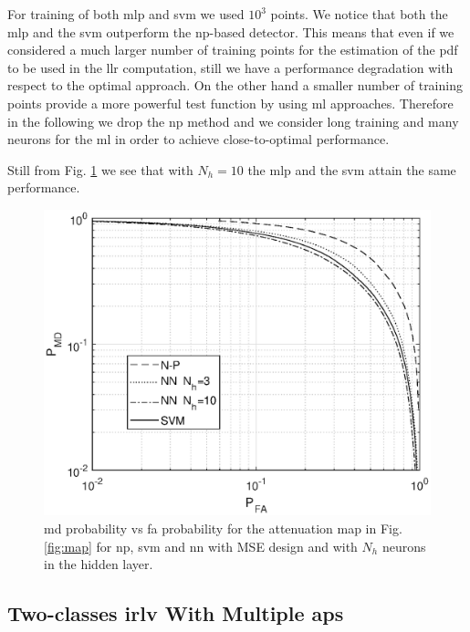 \documentclass[draftcls,onecolumn,12pt]{IEEEtran}
\begin{document}
For training of both \ac{mlp} and \ac{svm} we used $10^3$ points. We notice that both the \ac{mlp} and the \ac{svm} outperform the \ac{np}-based detector. This means that even if we considered a much larger number of training points for the estimation of the \ac{pdf} to be used in the \ac{llr} computation, still we have a performance degradation with respect to the optimal approach. On the other hand a smaller number of training points provide a more powerful test function by using \ac{ml} approaches. Therefore in the following we drop the \ac{np} method and we consider long training and many neurons for the \ac{ml} in order to achieve close-to-optimal performance.

Still from Fig. \ref{fig:trueMap} we see that with $N_h=10$ the \ac{mlp} and the \ac{svm} attain the same performance. 

\begin{figure}[t]
    \centering
    \includegraphics[width=0.6\columnwidth]{res_NP_approx_SVM.eps}
    \caption{\ac{md} probability vs \ac{fa} probability for the attenuation map in Fig. \ref{fig:map} for \ac{np}, \ac{svm} and \ac{nn} with MSE design and with $N_h$ neurons in the hidden layer.}
    \label{fig:trueMap}
\end{figure}


\subsection{Two-classes \ac{irlv} With Multiple \acp{ap}}\label{sec:res_fading}
\end{document}
